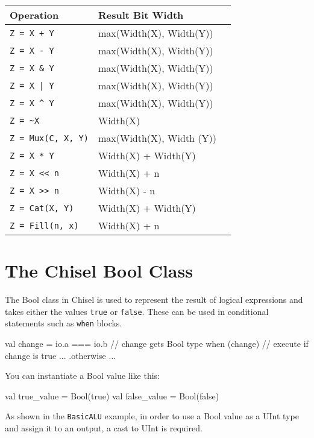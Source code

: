 \documentclass[twocolumn, 10pt]{article}
\begin{document}
\begin{center}
	\begin{tabular}{| l | l | l | }
	\hline
	Operation & Result Bit Width \\ \hline
	\verb!Z = X + Y! & max(Width(X), Width(Y))  \\ \hline
        \verb+Z = X - Y+ & max(Width(X), Width(Y)) \\ \hline
	\verb+Z = X & Y+ & max(Width(X), Width(Y)) \\ \hline
	\verb+Z = X | Y+ & max(Width(X), Width(Y)) \\ \hline
	\verb+Z = X ^ Y+ & max(Width(X), Width(Y)) \\ \hline
	\verb+Z = ~X+ & Width(X) \\ \hline
	\verb+Z = Mux(C, X, Y)+ & max(Width(X), Width (Y)) \\ \hline
	\verb+Z = X * Y+ & Width(X) + Width(Y) \\ \hline
	\verb+Z = X << n+ & Width(X) + n \\ \hline
	\verb+Z = X >> n+ & Width(X) - n \\ \hline
	\verb+Z = Cat(X, Y)+ & Width(X) + Width(Y) \\ \hline
	\verb+Z = Fill(n, x)+ & Width(X) + n \\ \hline
	\end{tabular}
\end{center}

\section{The Chisel Bool Class}

The Bool class in Chisel is used to represent the result of logical expressions and takes either the values \verb+true+ or \verb+false+. These can be used in conditional statements such as \verb+when+ blocks.

\begin{scala}
val change = io.a === io.b // change gets Bool type
when (change) { // execute if change is true
	...
} .otherwise {
	...
}
\end{scala}

You can instantiate a Bool value like this:

\begin{scala}
val true_value  = Bool(true)
val false_value = Bool(false)
\end{scala}

As shown in the \verb+BasicALU+ example, in order to use a Bool value as a UInt type and assign it to an output, a cast to UInt is required.
\end{document}
